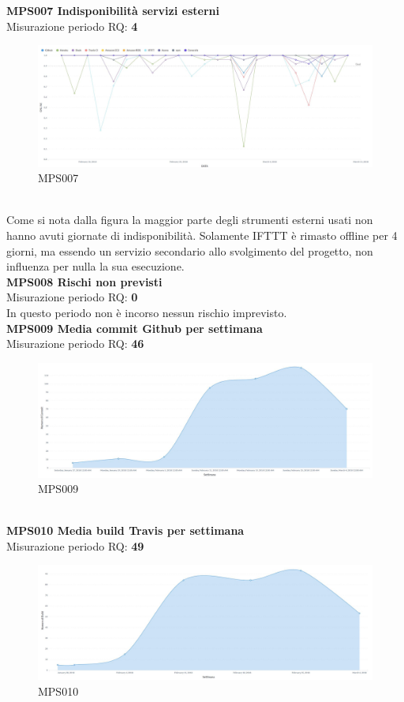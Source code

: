 \documentclass[PianoDiQualifica.tex]{subfiles}
\begin{document}
\textbf{MPS007 Indisponibilità servizi esterni}\\
Misurazione periodo RQ: \textbf{4}
\begin{figure}[htb]
	\centering
	\includegraphics[width=1\linewidth]{RP/MPS007}
	\caption{MPS007}
	\label{fig:processi}
\end{figure}
\\Come si nota dalla figura la maggior parte degli strumenti esterni usati non hanno avuti giornate di indisponibilità.
Solamente IFTTT è rimasto offline per 4 giorni, ma essendo un servizio secondario allo svolgimento del progetto, non influenza per nulla la sua esecuzione. \\

\textbf{MPS008 Rischi non previsti}\\
Misurazione periodo RQ: \textbf{0}\\
In questo periodo non è incorso nessun rischio imprevisto.\\

\textbf{MPS009 Media commit Github per settimana}\\
Misurazione periodo RQ: \textbf{46}
\begin{figure}[htb]
	\centering
	\includegraphics[width=1\linewidth]{RP/MPS009}
	\caption{MPS009}
	\label{fig:processi}
\end{figure}
\\
\textbf{MPS010 Media build Travis per settimana}\\
Misurazione periodo RQ: \textbf{49}
\begin{figure}[htb]
	\centering
	\includegraphics[width=1\linewidth]{RP/MPS010}
	\caption{MPS010}
	\label{fig:processi}
\end{figure}
\\
\end{document}
